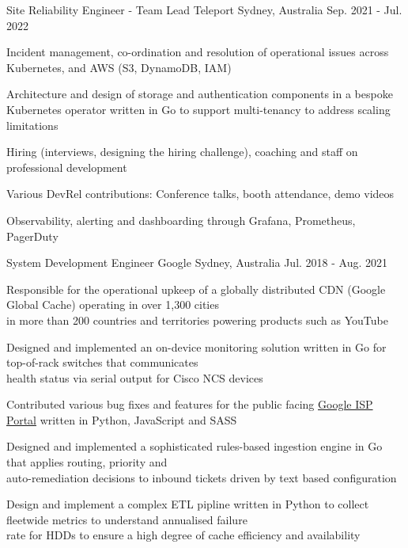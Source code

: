 \begin{cventries}
  \cventry
    {Site Reliability Engineer - Team Lead} %
    {Teleport} %
    {Sydney, Australia} %
    {Sep. 2021 - Jul. 2022} %
    {
      \begin{cvitems} %
      \item {Incident management, co-ordination and resolution of operational issues across Kubernetes, and AWS (S3, DynamoDB, IAM)}
      \item {Architecture and design of storage and authentication components in a bespoke Kubernetes operator written in Go to support multi-tenancy to address scaling limitations}
      \item {Hiring (interviews, designing the hiring challenge), coaching and staff on professional development}
      \item {Various DevRel contributions: Conference talks, booth attendance, demo videos}
      \item {Observability, alerting and dashboarding through Grafana, Prometheus, PagerDuty}
      \end{cvitems}
    }


  \cventry
    {System Development Engineer} %
    {Google} %
    {Sydney, Australia} %
    {Jul. 2018 - Aug. 2021} %
    {
      \begin{cvitems} %
        \item {Responsible for the operational upkeep of a globally distributed CDN (Google Global Cache) operating in over 1,300 cities\\
         in more than 200 countries and territories powering products such as YouTube}
        \item {Designed and implemented an on-device monitoring solution written in Go for top-of-rack switches that communicates\\
         health status via serial output for Cisco NCS devices}
        \item {Contributed various bug fixes and features for the public facing \href{https://peering.google.com/}{Google ISP Portal} written in Python, JavaScript and SASS}
        \item {Designed and implemented a sophisticated rules-based ingestion engine in Go that applies routing, priority and\\
         auto-remediation decisions to inbound tickets driven by text based configuration}
        \item {Design and implement a complex ETL pipline written in Python to collect fleetwide metrics to understand annualised failure\\
         rate for HDDs to ensure a high degree of cache efficiency and availability}
      \end{cvitems}
    }



\end{cventries}
